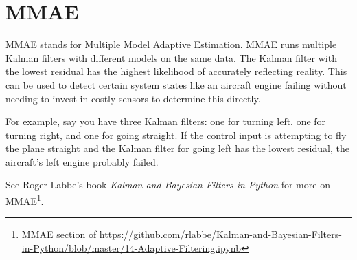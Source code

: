 \section{MMAE}

MMAE stands for Multiple Model Adaptive Estimation. MMAE runs multiple Kalman
filters with different \glspl{model} on the same data. The Kalman filter with
the lowest residual has the highest likelihood of accurately reflecting reality.
This can be used to detect certain \gls{system} \glspl{state} like an aircraft
engine failing without needing to invest in costly sensors to determine this
directly.

For example, say you have three Kalman filters: one for turning left, one for
turning right, and one for going straight. If the \gls{control input} is
attempting to fly the plane straight and the Kalman filter for going left has
the lowest residual, the aircraft's left engine probably failed.

See Roger Labbe's book \textit{Kalman and Bayesian Filters in Python} for more
on MMAE\footnote{MMAE section of
\url{https://github.com/rlabbe/Kalman-and-Bayesian-Filters-in-Python/blob/master/14-Adaptive-Filtering.ipynb}}.
